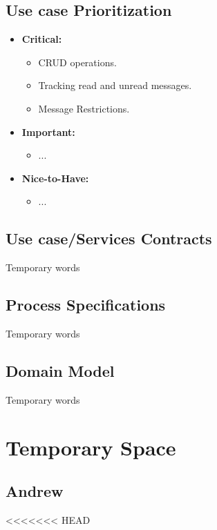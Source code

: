 \documentclass[11pt]{article}
\begin{document}
\subsection{Use case Prioritization}
\begin{itemize}
\item \textbf{Critical: }
	\begin{itemize}
		\item CRUD operations.
		\item Tracking read and unread messages.
		\item Message Restrictions.
	\end{itemize}

\item \textbf{Important: }
	\begin{itemize}
		\item ...
	\end{itemize}

\item \textbf{Nice-to-Have: }
	\begin{itemize}
		\item ...
	\end{itemize}
\end{itemize}
\subsection{Use case/Services Contracts}
Temporary words
\subsection{Process Specifications}
Temporary words
\subsection{Domain Model}
Temporary words

\newpage
\section{Temporary Space}

\subsection{Andrew}
<<<<<<< HEAD
\end{document}
